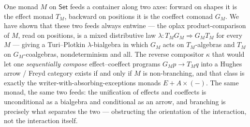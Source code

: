 \documentclass[11pt]{amsart}
\theoremstyle{plain}
\theoremstyle{definition}
\theoremstyle{remark}
\newcommand{\Set}{\mathsf{Set}}
\begin{document}
One monad $M$ on $\Set$ feeds a container along two axes: forward on shapes it is the effect
monad $T_M$, backward on positions it is the coeffect comonad $G_M$. We have shown that these
two feeds always entwine --- the oplax product-comparison of $M$, read on positions, is a
mixed distributive law $\lambda\colon T_M G_M\Rightarrow G_M T_M$ for every $M$ --- giving a
Turi--Plotkin $\lambda$-bialgebra in which $G_M$ acts on $T_M$-algebras and $T_M$ on
$G_M$-coalgebras, nondeterminism and all. The reverse compositor $\kappa$ that would let one
\emph{sequentially compose} effect--coeffect programs $G_M p\to T_M q$ into a Hughes arrow /
Freyd category exists if and only if $M$ is non-branching, and that class is exactly the
writer-with-absorbing-exceptions monads $E+A\times(-)$. The same monad, the same two feeds:
the unification of effects and coeffects is unconditional as a bialgebra and conditional as an
arrow, and branching is precisely what separates the two --- obstructing the orientation of the
interaction, not the interaction itself.
\end{document}

